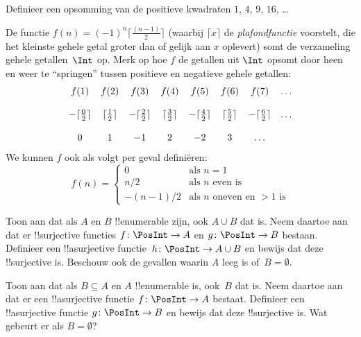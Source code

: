 \documentclass[../../../include/open-logic-section]{subfiles}
\begin{document}
\begin{prob}
Definieer een opsomming van de positieve kwadraten $1$, $4$, $9$, $16$, \dots
\end{prob}

\begin{ex}
De functie $f(n) = (-1)^{n} \lceil \frac{(n-1)}{2}\rceil$ (waarbij
$\lceil x \rceil$ de \emph{plafondfunctie} voorstelt, die het kleinste
gehele getal groter dan of gelijk aan $x$ oplevert) somt de verzameling
gehele getallen~$\Int$ op. Merk op hoe $f$ de getallen uit $\Int$
opsomt door heen en weer te ``springen'' tussen positieve en
negatieve gehele getallen:
\[
\begin{array}{c c c c c c c c}
f(1) & f(2) & f(3) & f(4) & f(5) & f(6) & f(7) & \dots \\ \\
- \lceil \tfrac{0}{2} \rceil & \lceil \tfrac{1}{2}\rceil & - \lceil \tfrac{2}{2} \rceil & \lceil \tfrac{3}{2} \rceil & - \lceil \tfrac{4}{2} \rceil  & \lceil \tfrac{5}{2}
\rceil & - \lceil \tfrac{6}{2} \rceil & \dots \\ \\
0 & 1 & -1 & 2 & -2 & 3 & \dots
\end{array}
\]
We kunnen $f$ ook als volgt per geval definiëren:
\[
f(n) = \begin{cases}
  0 & \text{als $n = 1$}\\
  n/2 & \text{als $n$ even is}\\
  -(n-1)/2 & \text{als $n$ oneven en $>1$ is}
  \end{cases}
\]
\end{ex}

\begin{prob}
  Toon aan dat als $A$ en $B$ !!{enumerable} zijn, ook $A \cup B$ dat is.
  Neem daartoe aan dat er !!{surjective} functies $f\colon \PosInt \to
  A$ en $g\colon \PosInt \to B$ bestaan. Definieer een !!a{surjective}
  functie~$h\colon \PosInt \to A \cup B$ en bewijs dat deze
  !!{surjective} is. Beschouw ook de gevallen waarin $A$ leeg is
  of~$B = \emptyset$.
\end{prob}
  
\begin{prob}
  Toon aan dat als $B \subseteq A$ en $A$ !!{enumerable} is, ook~$B$
  dat is. Neem daartoe aan dat er een !!a{surjective} functie
  $f\colon \PosInt \to A$ bestaat. Definieer een !!a{surjective} functie
  $g\colon \PosInt \to B$ en bewijs dat deze !!{surjective} is. Wat
  gebeurt er als $B = \emptyset$?
\end{prob}
    
\end{document}
